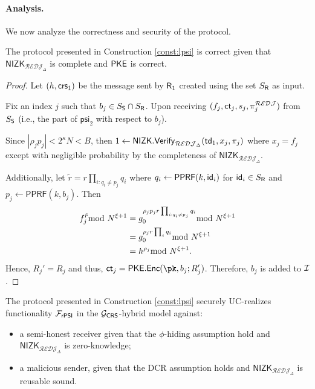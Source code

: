 \paragraph{Analysis.} We now analyze the correctness and security of the protocol.
\begin{theorem}
\label{theor:correctPSI}
The protocol presented in Construction \ref{const:lpsi} is correct given that $\mathsf{NIZK}_{\mathcal{REDJ}_{\Delta}}$ is complete and $\mathsf{PKE}$ is correct.
\end{theorem}
\begin{proof}

Let $(h,\mathsf{crs}_1)$ be the message sent by $\mathsf{R}_1$ created using the set $S_{\mathsf{R}}$ as input. 

Fix an index $j$ such that $b_j\in S_{\mathsf{S}}\cap S_{\mathsf{R}}$. Upon receiving $(f_j,\mathsf{ct}_j,s_j,\pi_j^\mathcal{REDJ})$ from $S_{\mathsf{S}}$ (i.e., the part of $\mathsf{psi}_2$ with respect to $b_j$).

Since $|\rho_jp_j|<2^{\kappa}N<B$, then $1\leftarrow\mathsf{NIZK.Verify}_{\mathcal{REDJ}_{\Delta}}(\mathsf{td}_1,x_j,\pi_j)$ where $x_j=f_j$ except with negligible probability by the completeness of $\mathsf{NIZK}_{\mathcal{REDJ}_\Delta}$.

Additionally, let  $\tilde r=r\prod_{i:q_i\neq p_j} q_i $ where $q_i\leftarrow\mathsf{PPRF}(k,\mathsf{id}_i)$ for $\mathsf{id}_i\in S_{\mathsf{R}}$ and $p_j\leftarrow\mathsf{PPRF}(k,b_j)$. Then \begin{align*}
    f_j^{\tilde r} \smod N^{\xi+1} & = g_0^{\rho_jp_j r \prod_{i:q_i\neq p_j} q_i } \smod N^{\xi+1}\\ 
    & = g_0 ^{\rho_j r \prod_{i} q_i } \smod N^{\xi+1}\\
    & = h ^{\rho_j} \smod N^{\xi+1}.
\end{align*}
Hence, $R_j'=R_j$ and thus, $\ct_j=\mathsf{PKE.Enc}(\pk,b_j;R_j')$. Therefore, $b_j $ is added to $\mathcal{I}$. 

\end{proof}

\begin{theorem}
\label{theor:securityPSI}
The protocol presented in Construction \ref{const:lpsi} securely UC-realizes functionality $\mathcal{F}_\mathsf{rPSI}$ in the $\mathcal{G}_\mathsf{CRS}$-hybrid model against:
\begin{itemize}
    \item a semi-honest receiver given that the $\phi$-hiding assumption hold and $\mathsf{NIZK}_{\mathcal{REDJ}_{\Delta}}$ is zero-knowledge;
    \item a malicious sender,  given that the DCR assumption holds and $\mathsf{NIZK}_{\mathcal{REDJ}_{\Delta}}$ is reusable sound.
\end{itemize}
\end{theorem}

